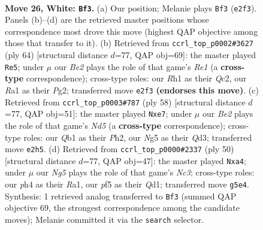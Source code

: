\documentclass[11pt]{article}
\begin{document}
\clearpage

\begin{figure}[p]\centering
\begin{subfigure}{0.46\textwidth}\centering
\resizebox{\linewidth}{!}{%
\newchessgame
\chessboard[
  setfen={rn4r1/4k3/1p2p3/pPq2pN1/5n1p/7P/P2KB1P1/RQ5R w - - 0 26},
  showmover=false,
  pgfstyle=straightmove, color=movearrow, markmove={e2-f3}
]}
\caption{}
\end{subfigure}\hfill
\begin{subfigure}{0.46\textwidth}\centering
\resizebox{\linewidth}{!}{%
\newchessgame
\chessboard[
  setfen={r5k1/3p1rp1/p3pP1p/q1Bn4/3P1P2/1R5P/1PQ3P1/4R1K1 w - - 3 33},
  showmover=false,
  pgfstyle=straightmove, color=movearrow, markmove={e1-e5}
]}
\caption{}
\end{subfigure}
\\[4pt]
\begin{subfigure}{0.46\textwidth}\centering
\resizebox{\linewidth}{!}{%
\newchessgame
\chessboard[
  setfen={1k1r4/1pp1nq2/p2p2pp/P2N4/3R1P2/3Q2P1/1PP4P/1K6 w - - 3 30},
  showmover=false,
  pgfstyle=straightmove, color=movearrow, markmove={d5-e7}
]}
\caption{}
\end{subfigure}\hfill
\begin{subfigure}{0.46\textwidth}\centering
\resizebox{\linewidth}{!}{%
\newchessgame
\chessboard[
  setfen={r4bk1/5p1p/2q2np1/4p3/p3P3/2N1BP1P/1r4PK/R2Q1R2 w - - 0 26},
  showmover=false,
  pgfstyle=straightmove, color=movearrow, markmove={c3-a4}
]}
\caption{}
\end{subfigure}
\caption{\textbf{Move 26, White: \texttt{Bf3}.} (a) Our position; Melanie plays \texttt{Bf3} (\texttt{e2f3}). Panels (b)--(d) are the retrieved master positions whose correspondence most drove this move (highest QAP objective among those that transfer to it). (b) Retrieved from \texttt{ccrl\_top\_p0002\#3627} (ply 64) [structural distance $d$=77, QAP obj=69]: the master played \texttt{Re5}; under $\mu$ our \emph{Be2} plays the role of that game's \emph{Re1} (a \textbf{cross-type} correspondence); cross-type roles: our \emph{R}h1 as their \emph{Q}c2, our \emph{R}a1 as their \emph{P}g2; transferred move \texttt{e2f3} \textbf{(endorses this move)}. (c) Retrieved from \texttt{ccrl\_top\_p0003\#787} (ply 58) [structural distance $d$=77, QAP obj=51]: the master played \texttt{Nxe7}; under $\mu$ our \emph{Be2} plays the role of that game's \emph{Nd5} (a \textbf{cross-type} correspondence); cross-type roles: our \emph{Q}b1 as their \emph{P}h2, our \emph{N}g5 as their \emph{Q}d3; transferred move \texttt{e2h5}. (d) Retrieved from \texttt{ccrl\_top\_p0000\#2337} (ply 50) [structural distance $d$=77, QAP obj=47]: the master played \texttt{Nxa4}; under $\mu$ our \emph{Ng5} plays the role of that game's \emph{Nc3}; cross-type roles: our \emph{p}h4 as their \emph{R}a1, our \emph{p}f5 as their \emph{Q}d1; transferred move \texttt{g5e4}. Synthesis: 1 retrieved analog transferred to \texttt{Bf3} (summed QAP objective 69, the strongest correspondence among the candidate moves); Melanie committed it via the \texttt{search} selector.}
\label{fig:thought-m50}
\end{figure}
\end{document}
